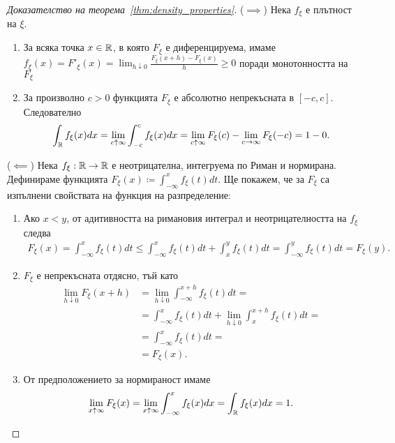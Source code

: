 \documentclass[numbers=endperiod, bibliography=totocnumbered]{scrartcl}
\begin{document}
\begin{proof}[Доказателство на теорема~\ref{thm:density_properties}]
  (\( \implies \)) Нека \( f_\xi \) е плътност на \( \xi \).
  \begin{enumerate}
    \item За всяка точка \( x \in \mathbb{R} \), в която \( F_\xi \) е диференцируема, имаме \( f_\xi(x) = F'_\xi(x) = \lim_{h \downarrow 0} \frac {F_\xi(x + h) - F_\xi(x)} h \geq 0 \) поради монотонността на \( F_\xi \)
    \item За произволно \( c > 0 \) функцията \( F_\xi \) е абсолютно непрекъсната в \( [-c, c] \). Следователно
    \begin{align*}
      \int_{\mathbb{R}} f_\xi(x) dx
      =
      \lim_{c \uparrow \infty} \int_{-c}^c f_\xi(x) dx
      =
      \lim_{c \uparrow \infty} F_\xi(c) - \lim_{c \to \infty} F_\xi(-c)
      =
      1 - 0.
    \end{align*}
  \end{enumerate}

  (\( \impliedby \)) Нека \( f_\xi: \mathbb{R} \to \mathbb{R} \) е неотрицателна, интегруема по Риман и нормирана. Дефинираме функцията \( F_\xi(x) \coloneqq \int_{-\infty}^x f_\xi(t) dt \). Ще покажем, че за \( F_\xi \) са изпълнени свойствата на функция на разпределение:
  \begin{enumerate}
    \item Ако \( x < y \), от адитивността на римановия интеграл и неотрицателността на \( f_\xi \) следва
    \begin{align*}
      F_\xi(x)
      =
      \int_{-\infty}^x f_\xi(t) dt
      \leq
      \int_{-\infty}^x f_\xi(t) dt + \int_x^y f_\xi(t) dt
      =
      \int_{-\infty}^y f_\xi(t) dt
      =
      F_\xi(y).
    \end{align*}

    \item \( F_\xi \) е непрекъсната отдясно, тъй като
    \begin{align*}
      \lim_{h \downarrow 0} F_\xi(x + h)
      &=
      \lim_{h \downarrow 0} \int_{-\infty}^{x + h} f_\xi(t) dt
      = \\ &=
      \int_{-\infty}^x f_\xi(t) dt + \lim_{h \downarrow 0} \int_x^{x + h} f_\xi(t) dt
      = \\ &=
      \int_{-\infty}^x f_\xi(t) dt
      = \\ &=
      F_\xi(x).
    \end{align*}

    \item От предположението за нормираност имаме
    \begin{align*}
      \lim_{x \uparrow \infty} F_\xi(x)
      =
      \lim_{x \uparrow \infty} \int_{-\infty}^x f_\xi(x) dx
      =
      \int_{\mathbb{R}} f_\xi(x) dx = 1.
    \end{align*}


\end{enumerate}
\end{proof}
\end{document}
